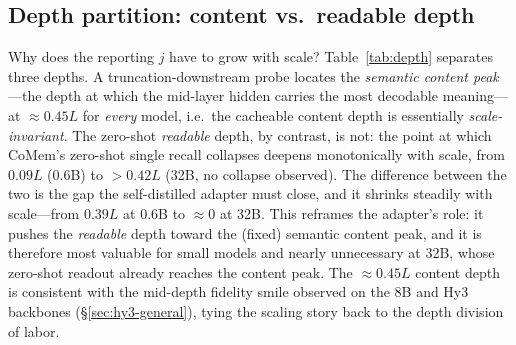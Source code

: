 

\subsection{Depth partition: content vs.\ readable depth}
\label{sec:depth-partition}
Why does the reporting $j$ have to grow with scale? Table~\ref{tab:depth}
separates three depths. A truncation-downstream probe locates the
\emph{semantic content peak}---the depth at which the mid-layer hidden carries
the most decodable meaning---at $\approx$$0.45L$ for \emph{every} model, i.e.\
the cacheable content depth is essentially \emph{scale-invariant}. The zero-shot
\emph{readable} depth, by contrast, is not: the point at which CoMem's zero-shot
single recall collapses deepens monotonically with scale, from $0.09L$ (0.6B) to
$>0.42L$ (32B, no collapse observed). The difference between the two is the gap
the self-distilled adapter must close, and it shrinks steadily with scale---from
$0.39L$ at 0.6B to $\approx$0 at 32B. This reframes the adapter's role: it pushes
the \emph{readable} depth toward the (fixed) semantic content peak, and it is
therefore most valuable for small models and nearly unnecessary at 32B, whose
zero-shot readout already reaches the content peak. The $\approx$$0.45L$ content
depth is consistent with the mid-depth fidelity smile observed on the 8B and Hy3
backbones (\S\ref{sec:hy3-general}), tying the scaling story back to the depth
division of labor.


